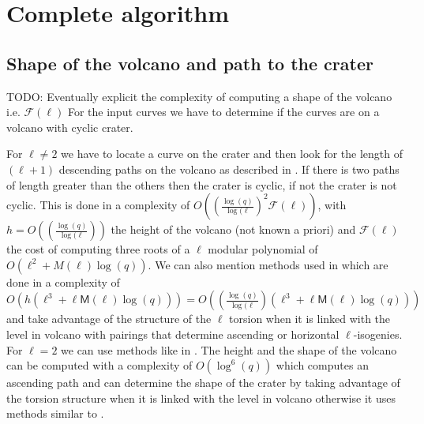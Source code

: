 \documentclass{lms}
\newcommand{\todo}[1]{{\color{red}TODO: #1}}
\begin{document}
\section{Complete algorithm}
\label{sec:complete-algorithm}
\subsection{Shape of the volcano and path to the crater}
	\label{sub: shape-volcano}
\todo{Eventually explicit the complexity of computing a shape of the volcano i.e. $\mathcal{F}(\ell)$}
  For the input curves we have to determine if the curves are on a volcano with cyclic crater. 
  
  For $\ell \neq 2$ we have to locate a curve on the crater and then look for  the length of $(\ell+1)$ descending paths on the volcano as described in \cite{volcano}. If there is two paths of length greater than the others then the crater is cyclic, if not the crater is not cyclic. This is done in a complexity of $O( ( \frac{\log(q)}{\log(\ell})^2 \mathcal{F}(\ell) )$, with $h=O(( \frac{\log(q)}{\log(\ell}))$ the height of the volcano (not known a priori) and $\mathcal{F}(\ell)$ the cost of computing three roots of a $\ell$ modular polynomial of $O(\ell^2+M(\ell)\log(q))$. We can also mention methods used in \cite{IonicaJ10} which are done in a complexity of $O(h(\ell^3+\ell \mathsf{M}(\ell) \log(q)))=O(( \frac{\log(q)}{\log(\ell})(\ell^3+\ell \mathsf{M}(\ell) \log(q)))$ and take advantage of the structure of the $\ell$ torsion when it is linked with the level in volcano with pairings that determine ascending or horizontal $\ell$-isogenies. %
\newline 
For $\ell=2$ we can use methods like in \cite{MiretMRV05}. The height and the shape of the volcano can be computed with a complexity of $O(\log^6(q))$ which computes an ascending path and can determine the shape of the crater by taking advantage of the torsion structure when it is linked with the level in volcano otherwise it uses methods similar to \cite{volcano}.
  
\end{document}
